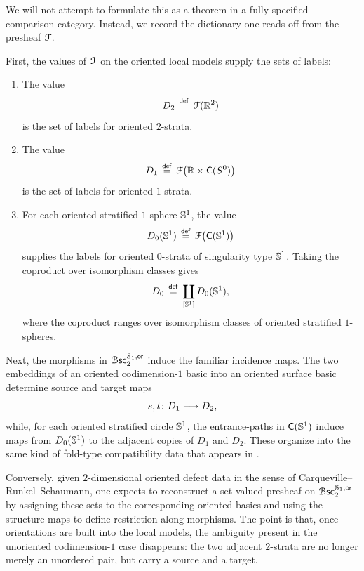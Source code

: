 \medskip

\nid We will not attempt to formulate this as a theorem in a fully specified comparison category. Instead, we record the dictionary one reads off from the presheaf $\mathcal F$.

\medskip

\nid First, the values of $\mathcal F$ on the oriented local models supply the sets of labels:
\begin{enumerate}
    \item The value
    \begin{equation}
        D_2 \, \overset{\sf def}{=} \, \mathcal F(\mathbb R^{2})
    \end{equation}
    is the set of labels for oriented $2$-strata.
    \item The value
    \begin{equation}
        D_1 \, \overset{\sf def}{=} \, \mathcal F\big(\mathbb R\times \mathsf C(S^0)\big)
    \end{equation}
    is the set of labels for oriented $1$-strata.
    \item For each oriented stratified $1$-sphere $\mathbb S^1$, the value
    \begin{equation}
        D_0(\mathbb S^1) \, \overset{\sf def}{=} \, \mathcal F\big(\mathsf C(\mathbb S^1)\big)
    \end{equation}
    supplies the labels for oriented $0$-strata of singularity type $\mathbb S^1$. Taking the coproduct over isomorphism classes gives
    \begin{equation}
        D_0 \, \overset{\sf def}{=} \, \coprod_{[\mathbb S^1]} D_0(\mathbb S^1),
    \end{equation}
    where the coproduct ranges over isomorphism classes of oriented stratified $1$-spheres.
\end{enumerate}

\nid Next, the morphisms in $\operatorname{\mathcal B\mathsf{sc}}_{2}^{\mathcal S_{1},\mathsf{or}}$ induce the familiar incidence maps. The two embeddings of an oriented codimension-$1$ basic into an oriented surface basic determine source and target maps
\begin{equation}
    s,t \colon D_1 \longrightarrow D_2,
\end{equation}
while, for each oriented stratified circle $\mathbb S^1$, the entrance-paths in $\mathsf C(\mathbb S^1)$ induce maps from $D_0(\mathbb S^1)$ to the adjacent copies of $D_1$ and $D_2$. These organize into the same kind of fold-type compatibility data that appears in \cite[Definition~2.4]{CRS19}.

\medskip

\nid Conversely, given $2$-dimensional oriented defect data in the sense of Carqueville--Runkel--Schaumann, one expects to reconstruct a set-valued presheaf on $\operatorname{\mathcal B\mathsf{sc}}_{2}^{\mathcal S_{1},\mathsf{or}}$ by assigning these sets to the corresponding oriented basics and using the structure maps to define restriction along morphisms. The point is that, once orientations are built into the local models, the ambiguity present in the unoriented codimension-$1$ case disappears: the two adjacent $2$-strata are no longer merely an unordered pair, but carry a source and a target.

